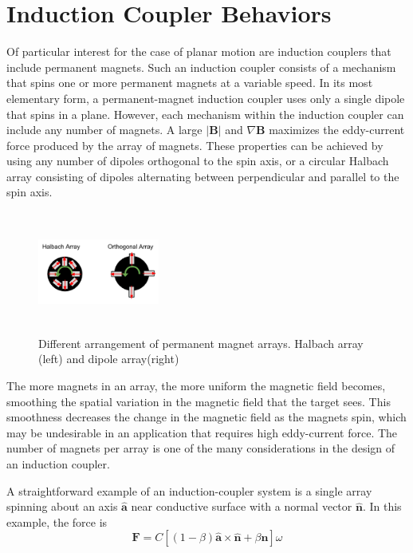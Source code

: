 \section{Induction Coupler Behaviors}

Of particular interest for the case of planar motion are induction couplers that include permanent magnets. Such an induction coupler consists of a mechanism that spins one or more permanent magnets at a variable speed. In its most elementary form, a permanent-magnet induction coupler uses only a single dipole that spins in a plane. However, each mechanism within the induction coupler can include any number of magnets. A large $\vert \textbf{B} \vert$ and $\nabla \textbf{B}$ maximizes the eddy-current force produced by the array of magnets. These properties can be achieved by using any number of dipoles orthogonal to the spin axis, or a circular Halbach array consisting of dipoles alternating between perpendicular and parallel to the spin axis.

\begin{figure}
\includegraphics[width = 4cm, height = 4cm ]{figures/Magnet_Arrays.png}

\caption{Different arrangement of permanent magnet arrays. Halbach array (left) and dipole array(right)}
\label{fig:magnet_arrays}
\end{figure}

The more magnets in an array, the more uniform the magnetic field becomes, smoothing the spatial variation in the magnetic field that the target sees. This smoothness decreases the change in the magnetic field as the magnets spin, which may be undesirable in an application that requires high eddy-current force. The number of magnets per array is one of the many considerations in the design of an induction coupler.

A straightforward example of an induction-coupler system is a single array spinning about an axis $\hat{\boldsymbol{a}}$ near conductive surface with a normal vector $\hat{\boldsymbol{n}}$. In this example, the force is 
\begin{equation}\label{eq:singlemagforce}
\textbf{F} = C\left[  \left(1-\beta \right )\hat{\boldsymbol{a}}{\times}\hat{\boldsymbol{n}} + \beta\hat{\boldsymbol{n}} \right ] \omega
\end{equation}


